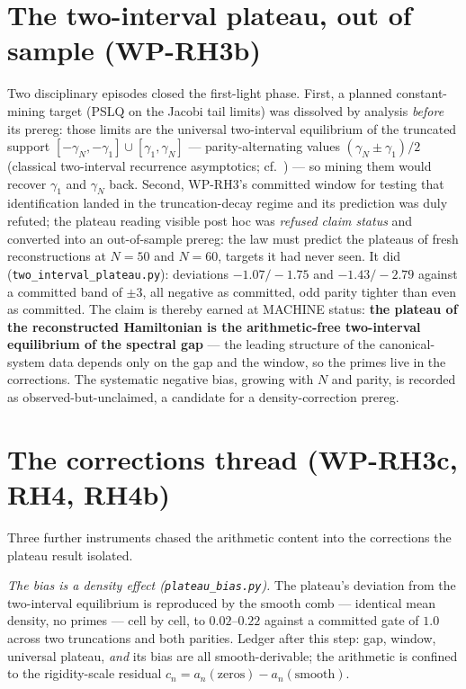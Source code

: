 \documentclass[11pt]{article}
\theoremstyle{remark}
\begin{document}
\section{The two-interval plateau, out of sample (WP-RH3b)}

Two disciplinary episodes closed the first-light phase. First, a planned constant-mining target
(PSLQ on the Jacobi tail limits) was dissolved by analysis \emph{before} its prereg: those limits
are the universal two-interval equilibrium of the truncated support
$[-\gamma_N, -\gamma_1] \cup [\gamma_1, \gamma_N]$ --- parity-alternating values
$(\gamma_N \pm \gamma_1)/2$ (classical two-interval recurrence asymptotics; cf.\ \cite{SimonSz}) ---
so mining them would recover $\gamma_1$ and $\gamma_N$ back. Second, WP-RH3's committed window for
testing that identification landed in the truncation-decay regime and its prediction was duly
refuted; the plateau reading visible post hoc was \emph{refused claim status} and converted into an
out-of-sample prereg: the law must predict the plateaus of fresh reconstructions at $N = 50$ and
$N = 60$, targets it had never seen. It did (\texttt{two\_interval\_plateau.py}): deviations
$-1.07/-1.75$ and $-1.43/-2.79$ against a committed band of $\pm 3$, all negative as committed,
odd parity tighter than even as committed. The claim is thereby earned at MACHINE status:
\textbf{the plateau of the reconstructed Hamiltonian is the arithmetic-free two-interval equilibrium
of the spectral gap} --- the leading structure of the canonical-system data depends only on the gap
and the window, so the primes live in the corrections. The systematic negative bias, growing with
$N$ and parity, is recorded as observed-but-unclaimed, a candidate for a density-correction prereg.

\section{The corrections thread (WP-RH3c, RH4, RH4b)}

Three further instruments chased the arithmetic content into the corrections the plateau result
isolated.

\emph{The bias is a density effect (\texttt{plateau\_bias.py}).} The plateau's deviation from the
two-interval equilibrium is reproduced by the smooth comb --- identical mean density, no primes ---
cell by cell, to $0.02$--$0.22$ against a committed gate of $1.0$ across two truncations and both
parities. Ledger after this step: gap, window, universal plateau, \emph{and} its bias are all
smooth-derivable; the arithmetic is confined to the rigidity-scale residual $c_n = a_n(\text{zeros})
- a_n(\text{smooth})$.
\end{document}
